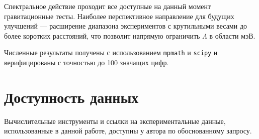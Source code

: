 \documentclass[aps,prd,twocolumn,superscriptaddress,nofootinbib,floatfix]{revtex4-2}
\begin{document}
Спектральное действие проходит все доступные на данный момент
гравитационные тесты. Наиболее перспективное направление для будущих
улучшений --- расширение диапазона экспериментов с крутильными весами
до более коротких расстояний, что позволит напрямую ограничить
$\Lambda$ в области мэВ.


\begin{acknowledgments}
Численные результаты получены с использованием \texttt{mpmath} и
\texttt{scipy} и верифицированы с точностью до 100 значащих цифр.
\end{acknowledgments}

\section*{Доступность данных}
Вычислительные инструменты и ссылки на экспериментальные данные,
использованные в данной работе, доступны у автора по обоснованному
запросу.


\end{document}
